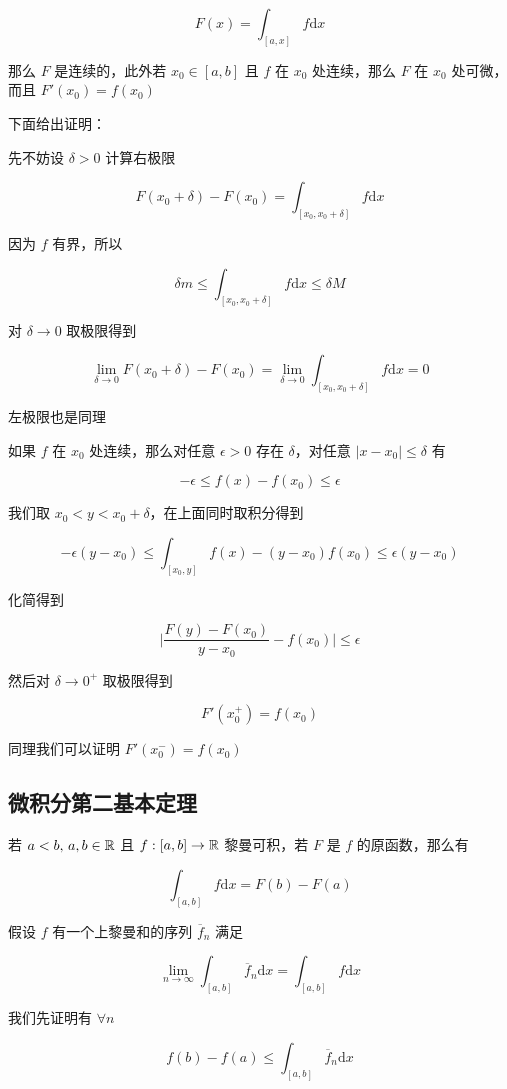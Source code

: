 \[
F(x) = \int_{[a,x]}f \mathrm{d}x
\]

那么 $F$ 是连续的，此外若 $x_0 \in [a,b]$ 且 $f$ 在 $x_0$ 处连续，那么 $F$ 在 $x_0$ 处可微，而且 $F'(x_0) = f(x_0)$

下面给出证明：

先不妨设 $\delta > 0$ 计算右极限

\[
F(x_0 + \delta) - F(x_0) = \int_{[x_0, x_0 + \delta]}f \mathrm{d}x 
\]

因为 $f$ 有界，所以

\[
\delta m \le \int_{[x_0, x_0 + \delta]}f \mathrm{d}x \le \delta M
\]

对 $\delta \to 0$ 取极限得到

\[
\lim_{\delta \to 0} F(x_0 + \delta) - F(x_0) = \lim_{\delta \to 0}\int_{[x_0, x_0 + \delta]}f \mathrm{d}x = 0
\]

左极限也是同理

如果 $f$ 在 $x_0$ 处连续，那么对任意 $\epsilon > 0$ 存在 $\delta$，对任意 $\lvert x - x_0 \rvert \le \delta$ 有

\[
-\epsilon \le f(x) - f(x_0) \le \epsilon
\]

我们取 $x_0 < y < x_0 + \delta$，在上面同时取积分得到

\[
-\epsilon(y-x_0) \le \int_{[x_0,y]}f(x) - (y-x_0)f(x_0) \le \epsilon(y-x_0)
\]

化简得到

\[
\lvert \frac{F(y) - F(x_0)}{y-x_0} - f(x_0) \rvert \le \epsilon 
\]

然后对 $\delta \to 0^+$ 取极限得到

\[
F'(x_0^+) = f(x_0)
\]

同理我们可以证明 $F'(x_0^-) = f(x_0)$

\subsection{微积分第二基本定理}

若 $a<b,\, a,b \in \mathbb{R}$ 且 $f: [a,b] \to \mathbb{R}$ 黎曼可积，若 $F$ 是 $f$ 的原函数，那么有

\[
\int_{[a,b]}f \mathrm{d} x = F(b) - F(a)
\]

假设 $f$ 有一个上黎曼和的序列 $\overline{f}_n$ 满足

\[
\lim_{n \to \infty} \int_{[a,b]}\overline{f}_n \mathrm{d}x = \int_{[a,b]}f \mathrm{d}x
\]

我们先证明有 $\forall n$ 

\[
f(b) - f(a) \le \int_{[a,b]}\overline{f}_n \mathrm{d}x
\]

